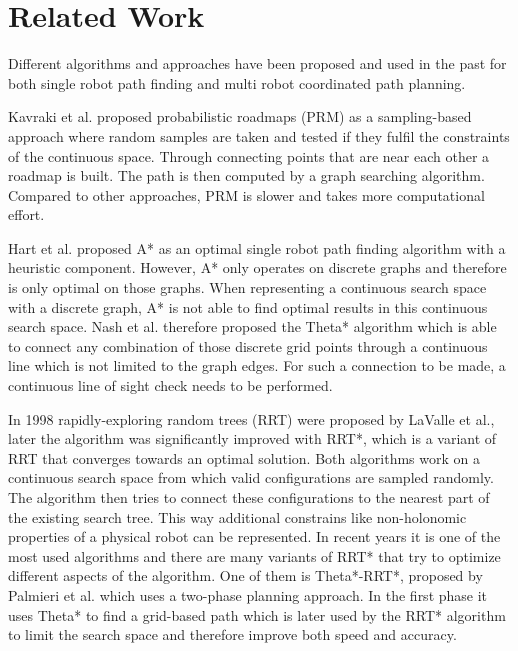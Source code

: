 \documentclass[journal]{IEEEtran}
\begin{document}
\section{Related Work}
\label{sec:related_work}
Different algorithms and approaches have been proposed and used in the past for both single robot path finding and multi robot coordinated path planning. 

Kavraki et al. \cite{Roadmaps} proposed probabilistic roadmaps (PRM) as a sampling-based approach where random samples are taken and tested if they fulfil the constraints of the continuous space. Through connecting points that are near each other a roadmap is built. The path is then computed by a graph searching algorithm. Compared to other approaches, PRM is slower and takes more computational effort.

Hart et al.\cite{AStar} proposed A* as an optimal single robot path finding algorithm with a heuristic component. However, A* only operates on discrete graphs and therefore is only optimal on those graphs. When representing a continuous search space with a discrete graph, A* is not able to find optimal results in this continuous search space. Nash et al.\cite{ThetaStar} therefore proposed the Theta* algorithm which is able to connect any combination of those discrete grid points through a continuous line which is not limited to the graph edges. For such a connection to be made, a continuous line of sight check needs to be performed.

In 1998 rapidly-exploring random trees (RRT) were proposed by LaValle et al.\cite{RRT}, later the algorithm was significantly improved with RRT*\cite{RRTStar}, which is a variant of RRT that converges towards an optimal solution. Both algorithms work on a continuous search space from which valid configurations are sampled randomly. The algorithm then tries to connect these configurations to the nearest part of the existing search tree. This way additional constrains like non-holonomic properties of a physical robot can be represented. In recent years it is one of the most used algorithms and there are many variants of RRT* that try to optimize different aspects of the algorithm. One of them is Theta*-RRT*, proposed by Palmieri et al.\cite{ThetaStarRRTStar} which uses a two-phase planning approach. In the first phase it uses Theta* to find a grid-based path which is later used by the RRT* algorithm to limit the search space and therefore improve both speed and accuracy.
\end{document}
